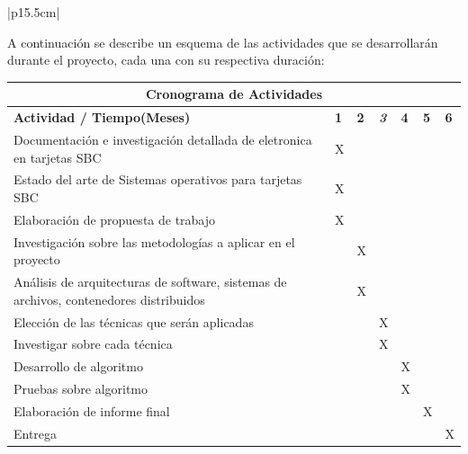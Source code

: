 \documentclass[letter,12pt]{article}
\begin{document}
\begin{center}
\begin{tabular}{|p{15.5cm}|}
\hline
{}\\
\hline

A continuación se describe un esquema de las actividades que se desarrollarán durante el proyecto, cada una con su respectiva duración:
    
    \begin{center}
    \begin{tabular}{|p{9.5cm}|p{0.4cm}|p{0.4cm}|p{0.4cm}|p{0.4cm}|p{0.4cm}|p{0.4cm}|}
    \hline
    \multicolumn{7}{|c|}{\textbf{Cronograma de Actividades}}\\
    \hline
    \textbf{Actividad / Tiempo(Meses)} & \textbf{1} & \textbf{2} & \textit{\textbf{3}} & \textbf{4} & \textbf{5} & \textbf{6} \\
    \hline
    Documentación e investigación detallada de eletronica en tarjetas SBC & X &   &   &   &   &   \\
    \hline
    Estado del arte de Sistemas operativos para tarjetas SBC & X &   &   &   &   &   \\
    \hline
    Elaboración de propuesta de trabajo & X &   &   &   &   &   \\
    \hline
    Investigación sobre las metodologías a aplicar en el proyecto &   & X &   &   &   &   \\
    \hline
    Análisis de arquitecturas de software, sistemas de archivos,  contenedores distribuidos&   & X &   &   &   &   \\
    \hline
    Elección de las técnicas que serán aplicadas &   &   & X &   &   &   \\
    \hline
    Investigar sobre cada técnica &   &   & X &   &   &   \\
    \hline
    Desarrollo de algoritmo &   &   &   & X &   &   \\
    \hline
    Pruebas sobre algoritmo &   &   &   & X &   &   \\
    \hline
    Elaboración de informe final &   &   &   &   & X &   \\
    \hline
    Entrega &   &   &   &   &   & X \\
    \hline
    \end{tabular}
    \end{center} \\

\hline
\end{tabular}
\end{center}
\end{document}
